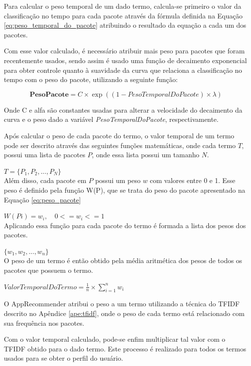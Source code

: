 Para calcular o peso temporal de um dado termo, calcula-se primeiro o valor da
classificação no tempo para cada pacote através da fórmula definida na Equação
\ref{eq:peso_temporal_do_pacote} atribuindo o resultado da equação a cada um
dos pacotes.

Com esse valor calculado, é necessário atribuir mais peso para pacotes que
foram recentemente usados, sendo assim é usado uma função de decaimento
exponencial para obter controle quanto à suavidade da curva que relaciona
a classificação no tempo com o peso do pacote, utilizando a seguinte função:

\begin{equation} \label{eq:peso_pacote}
\textbf{PesoPacote} = C \times \exp\left(({1 - PesoTemporalDoPacote}) \times {\lambda}\right)
\end{equation}

Onde C e alfa são constantes usadas para alterar a velocidade do decaimento da
curva e o peso dado a variável \textit{PesoTemporalDoPacote}, respectivamente.

Após calcular o peso de cada pacote do termo, o valor temporal de um termo pode ser
descrito através das seguintes funções matemáticas, onde cada termo $T$, possui uma
lista de pacotes $P$, onde essa lista possui um tamanho $N$.

$T = \{P_1, P_2, ..., P_N\}$
\\

Além disso, cada pacote em $P$ possui um peso $w$ com valores entre 0 e 1.
Esse peso é definido pela função W(P), que se trata do peso do pacote
apresentado na Equação \ref{eq:peso_pacote}

$W(Pi) = w_i , \quad 0 <= w_i <= 1$
\\

Aplicando essa função para cada pacote do termo é formada a lista dos pesos
dos pacotes.

$\{w_1, w_2, ..., w_n\}$
\\

O peso de um termo é então obtido pela média aritmética dos pesos de todos os
pacotes que possuem o termo.

$ValorTemporalDoTermo = \frac{1}{n} \times \sum\limits_{i=1}^{n} w_i$

O AppRecommender atribui o peso a um termo utilizando a técnica do TFIDF
descrito no Apêndice \ref{ape:tfidf}, onde o peso de cada termo está relacionado
com sua frequência nos pacotes.

Com o valor temporal calculado, pode-se enfim multiplicar tal valor com o TFIDF
obtido para o dado termo. Este processo é realizado para todos os termos usados
para se obter o perfil do usuário.

